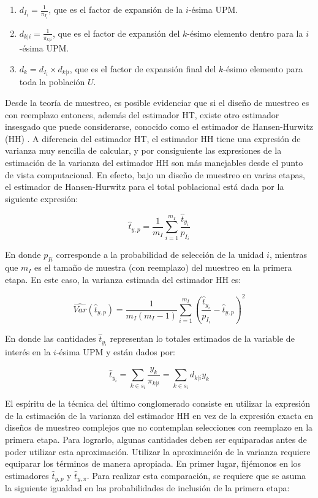 \documentclass[
  12pt,
]{book}
\providecommand{\tightlist}{%
  \setlength{\itemsep}{0pt}\setlength{\parskip}{0pt}}
\begin{document}
\begin{enumerate}
\def\labelenumi{\arabic{enumi}.}
\tightlist
\item
  \(d_{I_i} = \frac{1}{\pi_{I_i}}\), que es el factor de expansión de la \(i\)-ésima UPM.
\item
  \(d_{k|i} = \frac{1}{\pi_{k|i}}\), que es el factor de expansión del \(k\)-ésimo elemento dentro para la \(i\)-ésima UPM.
\item
  \(d_k = d_{I_i} \times d_{k|i}\), que es el factor de expansión final del \(k\)-ésimo elemento para toda la población \(U\).
\end{enumerate}

Desde la teoría de muestreo, es posible evidenciar que si el diseño de muestreo es con reemplazo entonces, además del estimador HT, existe otro estimador insesgado que puede considerarse, conocido como el estimador de Hansen-Hurwitz (HH) \citep{Gutierrez_2016}. A diferencia del estimador HT, el estimador HH tiene una expresión de varianza muy sencilla de calcular, y por consiguiente las expresiones de la estimación de la varianza del estimador HH son más manejables desde el punto de vista computacional. En efecto, bajo un diseño de muestreo en varias etapas, el estimador de Hansen-Hurwitz para el total poblacional está dada por la siguiente expresión:

\[
\hat{t}_{y,p}=\frac{1}{m_I}\sum_{i=1}^{m_I}\frac{\hat{t}_{y_i}}{p_{I_i}}
\]

En donde \(p_{Ii}\) corresponde a la probabilidad de selección de la unidad \(i\), mientras que \(m_I\) es el tamaño de muestra (con reemplazo) del muestreo en la primera etapa. En este caso, la varianza estimada del estimador HH es:

\[
\widehat{Var}(\hat{t}_{y,p})=\frac{1}{m_I(m_I-1)}\sum_{i=1}^{m_I}\left(\frac{\hat{t}_{y_i}}{p_{I_i}}-\hat{t}_{y,p}\right)^2
\]

En donde las cantidades \(\hat{t}_{y_i}\) representan lo totales estimados de la variable de interés en la \(i\)-ésima UPM y están dados por:

\[
\hat{t}_{y_i} = \sum_{k \in s_i} \frac{y_k}{\pi_{k|i}}
= \sum_{k \in s_i} d_{k|i} y_k 
\]

El espíritu de la técnica del último conglomerado consiste en utilizar la expresión de la estimación de la varianza del estimador HH en vez de la expresión exacta en diseños de muestreo complejos que no contemplan selecciones con reemplazo en la primera etapa. Para lograrlo, algunas cantidades deben ser equiparadas antes de poder utilizar esta aproximación.
Utilizar la aproximación de la varianza requiere equiparar los términos de manera apropiada. En primer lugar, fijémonos en los estimadores \(\hat{t}_{y,p}\) y \(\hat{t}_{y,\pi}\). Para realizar esta comparación, se requiere que
se asuma la siguiente igualdad en las probabilidades de inclusión de la primera etapa:
\end{document}

